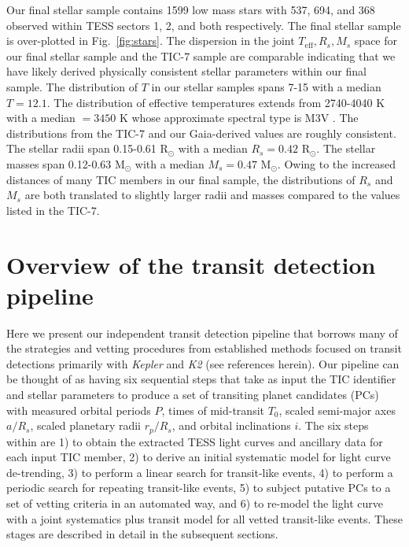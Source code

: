 Our final stellar sample contains 1599 low mass stars with 537, 694, and 368
observed within TESS sectors 1, 2, and both respectively.
The final stellar sample is over-plotted in Fig.~\ref{fig:stars}.
The dispersion in the joint $T_{\text{eff}},R_s,M_s$ space for our final stellar sample and the
TIC-7 sample are comparable indicating that we have likely derived physically consistent stellar
parameters within our final sample. The distribution of $T$
in our stellar samples spans 7-15 with a median $T=12.1$. The distribution of
effective temperatures extends from 2740-4040 K with a median \teff{} $=3450$ K
whose approximate spectral type is M3V \citep{pecaut13}. The \teff{} distributions from the TIC-7 and
our Gaia-derived values are roughly consistent. The stellar radii span 0.15-0.61 R$_{\odot}$
with a median $R_s=0.42$ R$_{\odot}$. The stellar masses span 0.12-0.63 M$_{\odot}$
with a median $M_s=0.47$ M$_{\odot}$. Owing to the increased distances of many TIC members in our final sample,
the distributions of $R_s$ and $M_s$ are both translated to slightly larger radii and masses compared
to the values listed in the TIC-7.


\section{Overview of the \pipeline{} transit detection pipeline} \label{sect:pipe}
Here we present our independent transit detection pipeline \pipeline{} that borrows many of the strategies and
vetting procedures from established methods focused on transit detections primarily with \emph{Kepler} and
\emph{K2} (see references herein).
Our pipeline can be thought of as having six sequential steps that
take as input the TIC identifier and stellar parameters to 
produce a set of transiting planet candidates (PCs) with measured orbital periods $P$, times of mid-transit
$T_0$, scaled semi-major axes $a/R_s$, scaled planetary radii $r_p/R_s$, and orbital inclinations $i$.
The six steps within \pipeline{} are 1) to obtain the extracted TESS light curves and ancillary data for
each input TIC member, 2) to derive an initial systematic model for light curve de-trending, 3) to perform a linear search
for transit-like events, 4) to perform a periodic search for repeating transit-like events, 5) to subject putative
PCs to a set of vetting criteria in an automated way, and 6) to re-model the light curve with a joint
systematics plus transit model for all vetted transit-like events. These stages are described
in detail in the subsequent sections.


